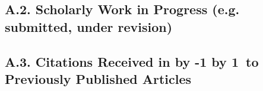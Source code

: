 \documentclass[10pt]{article}
\newcommand{\junk}[1]{}
\newcommand\LastYear{ %
  \advance\year by -1 \the\year\advance\year by 1}
\begin{document}
\junk{
\subsubsection*{A.1.h. Conference papers with proceedings (Do not enclose copies of these papers)}



}

\subsection*{A.2. Scholarly Work in Progress (e.g. submitted, under revision)}



\subsection*{A.3. Citations Received in \LastYear ~to Previously Published Articles}


\end{document}
